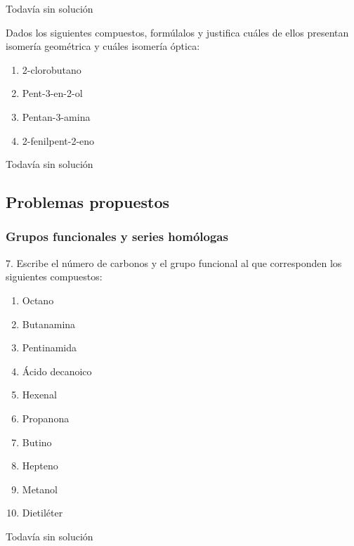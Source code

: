 \documentclass[twocolumn]{article}
\begin{document}
\begin{solution}[print=false]
  Todavía sin solución
\end{solution}

\begin{exercise}
  Dados los siguientes compuestos, formúlalos y justifica cuáles
  de ellos presentan isomería geométrica y cuáles isomería
  óptica:
  \begin{enumerate}
    \item 2-clorobutano
    \item Pent-3-en-2-ol
    \item Pentan-3-amina
    \item 2-fenilpent-2-eno
  \end{enumerate}
\end{exercise}

\begin{solution}[print=false]
  Todavía sin solución
\end{solution}

\subsection{Problemas propuestos}

\subsubsection{Grupos funcionales y series homólogas}

\begin{exercise}
  7. Escribe el número de carbonos y el grupo funcional al que
  corresponden los siguientes compuestos:
  \begin{enumerate}
    \item Octano
    \item Butanamina
    \item Pentinamida
    \item Ácido decanoico
    \item Hexenal
    \item Propanona
    \item Butino
    \item Hepteno
    \item Metanol
    \item Dietiléter
  \end{enumerate}
\end{exercise}

\begin{solution}[print=false]
  Todavía sin solución
\end{solution}
\end{document}
